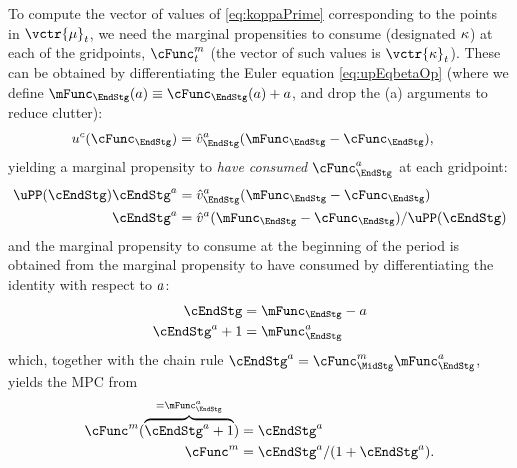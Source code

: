 \documentclass[SolvingMicroDSOPs]{subfiles}
\begin{document}
To compute the vector of values of \eqref{eq:koppaPrime} corresponding
to the points in $\vctr{\mu}_{\prd}$, we need the marginal propensities to
consume (designated $\kappa$) at each of the gridpoints,
$\cFunc^{\mNrm}_{\prd}$ (the vector of such values is
$\vctr{\MPC}_{\prd}$).  These can be obtained by differentiating the
Euler equation \eqref{eq:upEqbetaOp} (where we define
$\mFunc_{\EndStg}(a) \equiv \cFunc_{\EndStg}(a)+{a}$, and drop the (a) arguments to reduce clutter):
\begin{equation}\begin{gathered}\begin{aligned}
      \uFunc^{c}(\cFunc_{\EndStg})   & = \hat{\vFunc}_{\EndStg}^{\aNrm}(\mFunc_{\EndStg}-\cFunc_{\EndStg}),
    \end{aligned}\end{gathered}\end{equation}
yielding a marginal propensity to
\textit{have consumed} $\cFunc_{\EndStg}^{\aNrm}$ at each gridpoint:
\begin{equation}\begin{gathered}\begin{aligned}
      \uPP(\cEndStg)\cEndStg^\aNrm  & = \hat{\vFunc}_{\EndStg}^{\aNrm}(\mFunc_{\EndStg}-\cFunc_{\EndStg})
      \\ \cEndStg^\aNrm  & = \hat{\vFunc}^{\aNrm}(\mFunc_{\EndStg}-\cFunc_{\EndStg})/\uPP(\cEndStg)
    \end{aligned}\end{gathered}\end{equation}
and the marginal propensity to consume at the beginning of the period is obtained from the marginal propensity to have consumed by differentiating the identity with respect to $a$:
\begin{equation*}\begin{gathered}\begin{aligned}
      \cEndStg  & = \mFunc_{\EndStg} - \aNrm
      \\ \cEndStg^{\aNrm}+1  & = \mFunc_{\EndStg}^{\aNrm}
    \end{aligned}\end{gathered}\end{equation*}
which, together with the chain rule $\cEndStg^\aNrm  = \cFunc^{\mNrm}_{\MidStg}\mFunc_{\EndStg}^{\aNrm}$, yields the MPC from
\begin{equation}\begin{gathered}\begin{aligned}
      \cFunc^{\mNrm}(\overbrace{\cEndStg^{\aNrm}+1}^{=\mFunc_{\EndStg}^{\aNrm}})  & = \cEndStg^{\aNrm}
      \\ \cFunc^\mNrm  & = \cEndStg^{\aNrm}/(1+\cEndStg^{\aNrm}) \label{eq:MPCfromMPTHC}.
    \end{aligned}\end{gathered}\end{equation}
\end{document}

